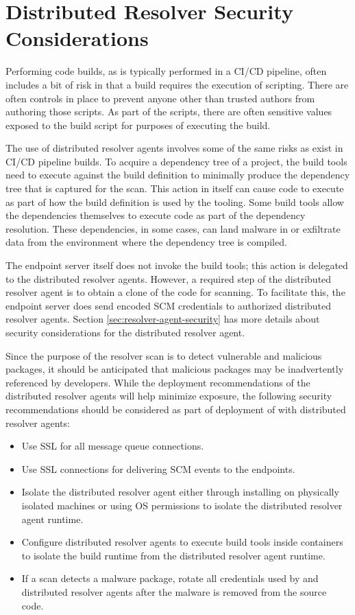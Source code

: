 \section{Distributed Resolver Security Considerations}

Performing code builds, as is typically performed in a CI/CD pipeline, often includes
a bit of risk in that a build requires the execution of scripting.  There are often
controls in place to prevent anyone other than trusted authors from authoring those scripts.
As part of the scripts, there are often sensitive values exposed to the build script
for purposes of executing the build.

The use of distributed resolver agents involves some of the same risks as exist in
CI/CD pipeline builds.  To acquire a dependency tree of a project, the build tools
need to execute against the build definition to minimally produce the dependency
tree that is captured for the scan.  This action in itself can cause code to execute
as part of how the build definition is used by the tooling.  Some build tools allow
the dependencies themselves to execute code as part of the dependency resolution.
These dependencies, in some cases, can land malware in or exfiltrate data from the
environment where the dependency tree is compiled.

The \cxoneflow endpoint server itself does not invoke the build tools; this action is
delegated to the distributed resolver agents.  However, a required step of the
distributed resolver agent is to obtain a clone of the code for scanning.  To facilitate this,
the \cxoneflow endpoint server does send encoded SCM credentials to authorized
distributed resolver agents.  Section \ref{sec:resolver-agent-security} has more details
about security considerations for the distributed resolver agent.

Since the purpose of the resolver scan is to detect vulnerable and malicious packages,
it should be anticipated that malicious packages may be inadvertently referenced
by developers.  While the deployment recommendations of the distributed resolver agents
will help minimize exposure, the following security recommendations should be considered
as part of deployment of \cxoneflow with distributed resolver agents:

\begin{itemize}
  \item Use SSL for all message queue connections.
  \item Use SSL connections for delivering SCM events to the \cxoneflow endpoints.
  \item Isolate the distributed resolver agent either through installing on physically isolated machines or
  using OS permissions to isolate the distributed resolver agent runtime.
  \item Configure distributed resolver agents to execute build tools inside containers to isolate the build runtime from
  the distributed resolver agent runtime.
  \item If a scan detects a malware package, rotate all credentials used by \cxoneflow and distributed resolver agents
  after the malware is removed from the source code.
\end{itemize}





